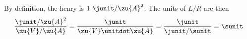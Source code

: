 By definition, the henry is $1\ \junit/\zu{A}^2$.
The units of $L/R$ are then
\begin{equation*}
  \frac{\junit/\zu{A}^2}{\zu{V}/\zu{A}}
      = \frac{\junit}{\zu{V}\unitdot\zu{A}}
      = \frac{\junit}{\junit/\sunit}
      = \sunit
\end{equation*}
